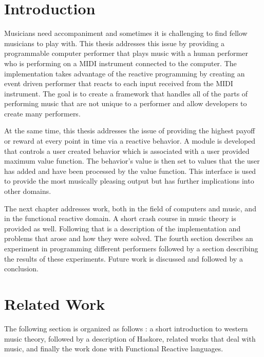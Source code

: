 \documentclass[12pt]{ucthesis}
\begin{document}





\chapter{Introduction}
\label{intro}

Musicians need accompaniment and sometimes it is challenging to find fellow musicians to play with. This thesis addresses this issue by providing a programmable computer performer that plays music with a human performer who is performing on a MIDI instrument connected to the computer. The implementation takes advantage of the reactive programming by creating an event driven performer that reacts to each input received from the MIDI instrument. The goal is to create a framework that handles all of the parts of performing music that are not unique to a performer and allow developers to create many performers. 

At the same time, this thesis addresses the issue of providing the highest payoff or reward at every point in time via a reactive behavior. A module is developed that controls a user created behavior which is associated with a user provided maximum value function. The behavior's value is then set to values that the user has added and have been processed by the value function. This interface is used to provide the most musically pleasing output but has further implications into other domains. 

The next chapter addresses work, both in the field of computers and music, and in the functional reactive domain. A short crash course in music theory is provided as well. Following that is a description of the implementation and problems that arose and how they were solved. The fourth section describes an experiment in programming different performers followed by a section describing the results of these experiments. Future work is discussed and followed by a conclusion.

\chapter{Related Work}
\label{rw}

The following section is organized as follows : a short introduction to western music theory, followed by a description of Haskore, related works that deal with music, and finally the work done with Functional Reactive languages.
\end{document}
